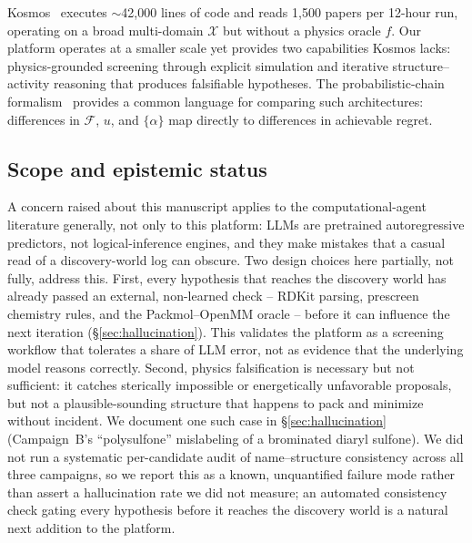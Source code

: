 \documentclass[twocolumn]{fairmeta}
\begin{document}
Kosmos~\cite{kosmos2025} executes ${\sim}$42,000 lines of code and reads 1,500 papers per 12-hour run, operating on a broad multi-domain $\mathcal{X}$ but without a physics oracle $f$.
Our platform operates at a smaller scale yet provides two capabilities Kosmos lacks: physics-grounded screening through explicit simulation and iterative structure--activity reasoning that produces falsifiable hypotheses.
The probabilistic-chain formalism~\cite{stephens2025mathframing} provides a common language for comparing such architectures: differences in $\mathcal{F}$, $u$, and $\{\alpha\}$ map directly to differences in achievable regret.

\subsection{Scope and epistemic status}
\label{sec:epistemic}

A concern raised about this manuscript applies to the computational-agent literature generally, not only to this platform: LLMs are pretrained autoregressive predictors, not logical-inference engines, and they make mistakes that a casual read of a discovery-world log can obscure.
Two design choices here partially, not fully, address this.
First, every hypothesis that reaches the discovery world has already passed an external, non-learned check -- RDKit parsing, prescreen chemistry rules, and the Packmol--OpenMM oracle -- before it can influence the next iteration (\S\ref{sec:hallucination}).
This validates the platform as a screening workflow that tolerates a share of LLM error, not as evidence that the underlying model reasons correctly.
Second, physics falsification is necessary but not sufficient: it catches sterically impossible or energetically unfavorable proposals, but not a plausible-sounding structure that happens to pack and minimize without incident.
We document one such case in \S\ref{sec:hallucination} (Campaign~B's ``polysulfone'' mislabeling of a brominated diaryl sulfone).
We did not run a systematic per-candidate audit of name--structure consistency across all three campaigns, so we report this as a known, unquantified failure mode rather than assert a hallucination rate we did not measure; an automated consistency check gating every hypothesis before it reaches the discovery world is a natural next addition to the platform.
\end{document}

